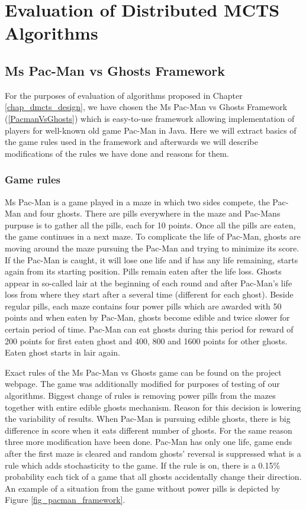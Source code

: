 \chapter{Evaluation of Distributed MCTS Algorithms}


\section{Ms Pac-Man vs Ghosts Framework}

For the purposes of evaluation of algorithms proposed in Chapter \ref{chap_dmcts_design}, we
have chosen the Ms Pac-Man vs Ghosts Framework (\ref{PacmanVsGhosts}) which is easy-to-use
framework allowing implementation of players for well-known old game Pac-Man in Java. Here we
will extract basics of the game rules used in the framework and afterwards we will
describe modifications of the rules we have done and reasons for them.

\subsection{Game rules}

Ms Pac-Man is a game played in a maze in which two sides compete, the Pac-Man and four ghosts.
There are pills everywhere in the maze and Pac-Mans purpuse is to gather all the pills, each
for 10 points. Once all the pills are eaten, the game continues in a next maze. To complicate
the life of Pac-Man, ghosts are moving around the maze pursuing the Pac-Man and trying to
minimize its score. If the Pac-Man is caught, it will lose one life and if has any life
remaining, starts again from its starting position. Pills remain eaten after the life loss.
Ghosts appear in so-called lair at the beginning of each round and after Pac-Man's life loss
from where they start after a several time (different for each ghost). Beside regular pills,
each maze contains four power pills which are awarded with 50 points and when eaten by Pac-Man,
ghosts become edible and twice slower for certain period of time. Pac-Man can eat ghosts during 
this period for
reward of 200 points for first eaten ghost and 400, 800 and 1600 points for other ghosts.
Eaten ghost starts in lair again.

Exact rules of the Ms Pac-Man vs Ghosts game can be found on the project webpage. The game was
additionally modified for purposes of testing of our algorithms. Biggest change of rules is
removing power pills from the mazes together with entire edible ghosts mechanism. Reason for
this decision is lowering the variability of results. When Pac-Man is pursuing edible ghosts,
there is big difference in score when it eats different number of ghosts. For the same reason
three more modification have been done. Pac-Man has only one life, game ends after the first
maze is cleared and random ghosts' reversal is suppressed what is a rule
which adds stochasticity to the game. If the rule is on, there is a 0.15\% probability each tick of
a game that all
ghosts accidentally change their direction. 
An example of a situation from the game without
power pills is depicted by Figure \ref{fig_pacman_framework}.

